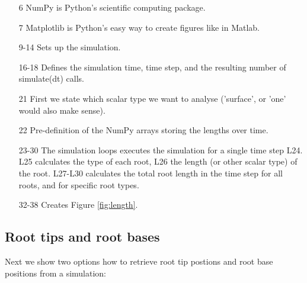 \begin{itemize}

\item[6] NumPy is Python's scientific computing package.
\item[7] Matplotlib is Python's easy way to create figures like in Matlab.

\item[9-14] Sets up the simulation.

\item[16-18] Defines the simulation time, time step, and the resulting number of simulate(dt) calls. 

\item[21] First we state which scalar type we want to analyse ('surface', or 'one' would also make sense).

\item[22] Pre-definition of the NumPy arrays storing the lengths over time. 

\item[23-30] The simulation loops executes the simulation for a single time step L24. L25 calculates the type of each root, L26 the length (or other scalar type) of the root. L27-L30 calculates the total root length in the time step for all roots, and for specific root types.

\item[32-38] Creates Figure \ref{fig:length}.

\end{itemize}



\subsection{Root tips and root bases}

Next we show two options how to retrieve root tip postions and root base positions from a simulation:



